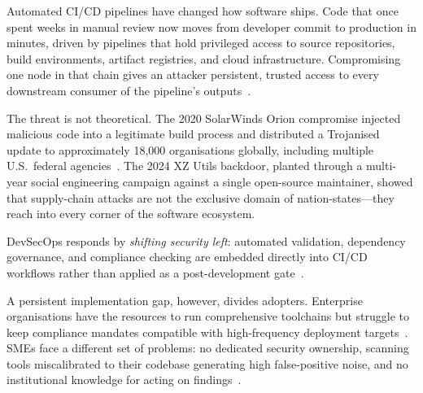 \documentclass[letterpaper, 10pt, conference]{ieeeconf}
\begin{document}
Automated CI/CD pipelines have changed how software ships. Code that once
spent weeks in manual review now moves from developer commit to production
in minutes, driven by pipelines that hold privileged access to source
repositories, build environments, artifact registries, and cloud
infrastructure. Compromising one node in that chain gives an attacker
persistent, trusted access to every downstream consumer of the pipeline's
outputs~\cite{nist2024}.

The threat is not theoretical. The 2020 SolarWinds Orion compromise
injected malicious code into a legitimate build process and distributed a
Trojanised update to approximately 18,000 organisations globally, including
multiple U.S.\ federal agencies~\cite{solanke2022}. The 2024 XZ Utils
backdoor, planted through a multi-year social engineering campaign against
a single open-source maintainer, showed that supply-chain attacks are not
the exclusive domain of nation-states---they reach into every corner of the
software ecosystem.

DevSecOps responds by \emph{shifting security left}: automated validation,
dependency governance, and compliance checking are embedded directly into
CI/CD workflows rather than applied as a post-development
gate~\cite{singh2020}.

A persistent implementation gap, however, divides adopters. Enterprise
organisations have the resources to run comprehensive toolchains but
struggle to keep compliance mandates compatible with high-frequency
deployment targets~\cite{solanke2022}. SMEs face a different set of
problems: no dedicated security ownership, scanning tools miscalibrated
to their codebase generating high false-positive noise, and no
institutional knowledge for acting on findings~\cite{cheenepalli2025}.
\end{document}

